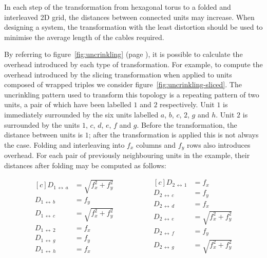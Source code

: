 			\label{sec:distortion}
			
			In each step of the transformation from hexagonal torus to a folded and
			interleaved 2D grid, the distances between connected units may increase.
			When designing a system, the transformation with the least distortion
			should be used to minimise the average length of the cables required.
			
			By referring to figure~\ref{fig:uncrinkling} (page
			\pageref{fig:uncrinkling}), it is possible to calculate the overhead
			introduced by each type of transformation.  For example, to compute the
			overhead introduced by the slicing transformation when applied to units
			composed of wrapped triples we consider
			figure~\ref{fig:uncrinkling-sliced}. The uncrinkling pattern used to
			transform this topology is a repeating pattern of two units, a pair of
			which have been labelled $1$ and $2$ respectively. Unit $1$ is
			immediately surrounded by the six units labelled $a$, $b$, $c$, $2$, $g$
			and $h$. Unit $2$ is surrounded by the units $1$, $c$, $d$, $e$, $f$ and
			$g$.  Before the transformation, the distance between units is $1$; after
			the transformation is applied this is not always the case. Folding and
			interleaving into $f_x$ columns and $f_y$ rows also introduces overhead.
			For each pair of previously neighbouring units in the example, their
			distances after folding may be computed as follows:
			
			\begin{equation*}
				\begin{aligned}[c]
					D_{1\,\leftrightarrow{}\,a} &= \sqrt{f_x^2 + f_y^2} \\
					D_{1\,\leftrightarrow{}\,b} &= f_y \\
					D_{1\,\leftrightarrow{}\,c} &= \sqrt{f_x^2 + f_y^2} \\
					D_{1\,\leftrightarrow{}\,2} &= f_x \\
					D_{1\,\leftrightarrow{}\,g} &= f_y \\
					D_{1\,\leftrightarrow{}\,h} &= f_x
				\end{aligned}
				\hspace{2cm}
				\begin{aligned}[c]
					D_{2\,\leftrightarrow{}\,1} &= f_x \\
					D_{2\,\leftrightarrow{}\,c} &= f_y \\
					D_{2\,\leftrightarrow{}\,d} &= f_x \\
					D_{2\,\leftrightarrow{}\,e} &= \sqrt{f_x^2 + f_y^2} \\
					D_{2\,\leftrightarrow{}\,f} &= f_y \\
					D_{2\,\leftrightarrow{}\,g} &= \sqrt{f_x^2 + f_y^2}
				\end{aligned}
			\end{equation*}
			
